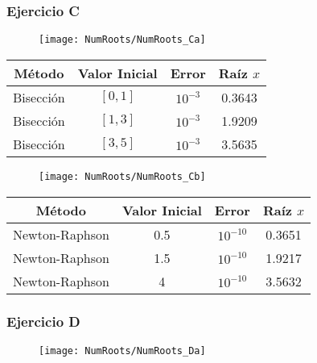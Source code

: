 \subsubsection{Ejercicio C}

\begin{figure}[H]
    \texttt{[image: NumRoots/NumRoots\_Ca]}
    \centering
\end{figure}

\begin{table}[H]
	\begin{center}
		\begin{tabular}{ |c|c|c|c| }
			\hline
			Método & Valor Inicial & Error & Raíz \(x\) \\
			\hline
			\hline
			Bisección 		& \([0,1]\) &	\(10^{-3}\) 	& 0.3643 	\\
			\hline
			Bisección 		& \([1,3]\) &	\(10^{-3}\) 	& 1.9209 	\\
			\hline
			Bisección 		& \([3,5]\) &	\(10^{-3}\) 	& 3.5635 	\\
			\hline
		\end{tabular}
	\end{center}
\end{table}

\begin{figure}[H]
    \texttt{[image: NumRoots/NumRoots\_Cb]}
    \centering
\end{figure}

\begin{table}[H]
	\begin{center}
		\begin{tabular}{ |c|c|c|c| }
			\hline
			Método & Valor Inicial & Error & Raíz \(x\) \\
			\hline
			\hline
			Newton-Raphson 	& 0.5 &	\(10^{-10}\) & 0.3651 	\\
			\hline
			Newton-Raphson 	& 1.5 &	\(10^{-10}\) & 1.9217 	\\
			\hline
			Newton-Raphson 	& 4 &	\(10^{-10}\) & 3.5632 	\\
			\hline
		\end{tabular}
	\end{center}
\end{table}

\subsubsection{Ejercicio D}

\begin{figure}[H]
    \texttt{[image: NumRoots/NumRoots\_Da]}
    \centering
\end{figure}

